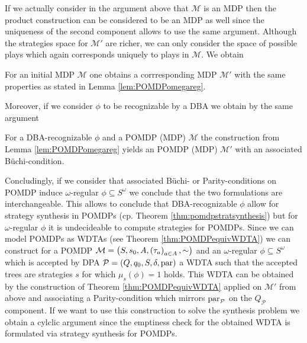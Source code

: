If we actually consider in the argument above that $\mathcal{M}$ is an \ac{MDP} 
then the product construction can be considered to be an \ac{MDP} as well since 
the uniqueness of the second component allows to use the same argument. 
Although the strategies space for $\mathcal{M'}$ are richer, we can only 
consider the space of possible plays which again corresponds uniquely to plays 
in $\mathcal{M}$. We obtain
\begin{corollary}
  For an initial \ac{MDP} $\mathcal{M}$ one obtains a corrresponding \ac{MDP} 
  $\mathcal{M}'$ with the same properties as stated in Lemma 
  \ref{lem:POMDPomegareg}.
\end{corollary}
Moreover, if we consider $\phi$ to be recognizable by a \ac{DBA} we obtain by
the same argument
\begin{corollary}
  For a \ac{DBA}-recognizable $\phi$ and a \ac{POMDP} (\ac{MDP}) $\mathcal{M}$
  the construction from Lemma \ref{lem:POMDPomegareg} yields an \ac{POMDP} 
  (\ac{MDP}) $\mathcal{M'}$ with an associated Büchi-condition.
  \label{cor:POMDPDBA}
\end{corollary}
Concludingly, if we consider that associated Büchi- or Parity-conditions on
\ac{POMDP} induce $\omega$-regular $\phi\subseteq S^{\omega}$ we conclude that
the two formulations are interchangeable. This allows to conclude that 
\ac{DBA}-recognizable $\phi$ allow for strategy synthesis in \acp{POMDP} (cp.
Theorem \ref{thm:pomdpstratsynthesis}) but for $\omega$-regular $\phi$ it is
undecideable to compute strategies for \acp{POMDP}. Since we can model 
\acp{POMDP} as \acp{WDTA} (see Theorem \ref{thm:POMDPequivWDTA}) we can 
construct for a \ac{POMDP} 
$\mathcal{M} = \left(S, s_{0}, A, \left(\tau_{a}\right)_{a\in A}, \sim\right)$ and an 
$\omega$-regular $\phi\subseteq S^{\omega}$ which is accepted by \ac{DPA}
$\mathcal{P} = \left(Q, q_{0}, S, \delta, \operatorname{par}\right)$ a \ac{WDTA} such that the
accepted trees are strategies $s$ for which $\mu_{s}(\phi) = 1$ holds. This
\ac{WDTA} can be obtained by the construction of Theorem 
\ref{thm:POMDPequivWDTA} applied on $\mathcal{M'}$ from above and associating a 
Parity-condition which mirrors $\operatorname{par}_{\mathcal{P}}$ on the $Q_{\mathcal{P}}$
component. If we want to use this construction to solve the synthesis problem 
we obtain a cylclic argument since the emptiness check for the obtained 
\ac{WDTA} is formulated via strategy synthesis for \acp{POMDP}.

